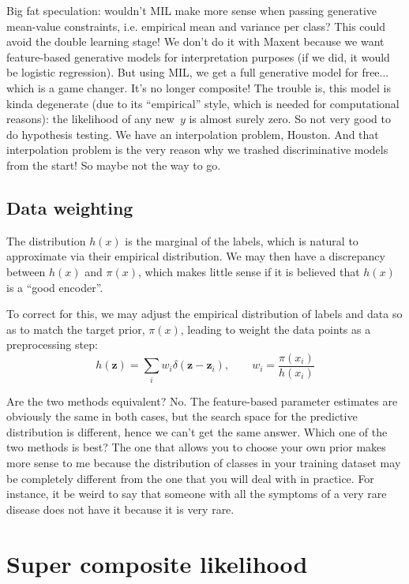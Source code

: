 \documentclass[english]{scrartcl}
\def\y{{\mathbf{y}}}
\def\y{{\mathbf{z}}}
\begin{document}
{\color{red} Big fat speculation: wouldn't MIL make more sense when passing generative mean-value constraints, i.e. empirical mean and variance per class? This could avoid the double learning stage! We don't do it with Maxent because we want feature-based generative models for interpretation purposes (if we did, it would be logistic regression). But using MIL, we get a full generative model for free... which is a game changer. It's no longer composite! The trouble is, this model is kinda degenerate (due to its ``empirical'' style, which is needed for computational reasons): the likelihood of any new~$y$ is almost surely zero. So not very good to do hypothesis testing. We have an interpolation problem, Houston. And that interpolation problem is the very reason why we trashed discriminative models from the start! So maybe not the way to go.}


\subsection{Data weighting}

The distribution $h(x)$ is the marginal of the labels, which is natural to approximate via their empirical distribution. We may then have a discrepancy between $h(x)$ and $\pi(x)$, which makes little sense if it is believed that $h(x)$ is a ``good encoder''. 

To correct for this, we may adjust the empirical distribution of labels and data so as to match the target prior, $\pi(x)$, leading to weight the data points as a preprocessing step:
$$
h(\y) = \sum_i w_i \delta(\y-\y_i),
\qquad
w_i = \frac{\pi(x_i)}{h(x_i)}
$$

Are the two methods equivalent? No. The feature-based parameter estimates are obviously the same in both cases, but the search space for the predictive distribution is different, hence we can't get the same answer. Which one of the two methods is best? The one that allows you to choose your own prior makes more sense to me because the distribution of classes in your training dataset may be completely different from the one that you will deal with in practice. For instance, it be weird to say that someone with all the symptoms of a very rare disease does not have it because it is very rare. 



\section{Super composite likelihood}
\label{appendix:super}
\end{document}

